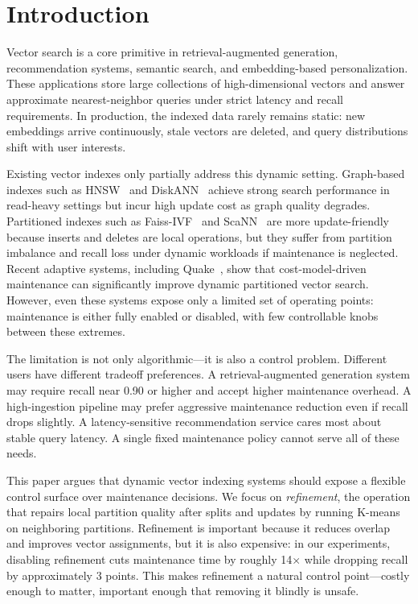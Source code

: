 \documentclass[sigconf, nonacm]{acmart}
\newcommand{\quake}{Quake\xspace}
\begin{document}
\maketitle

\section{Introduction}
\label{sec:intro}

Vector search is a core primitive in retrieval-augmented generation,
recommendation systems, semantic search, and embedding-based
personalization. These applications store large collections of
high-dimensional vectors and answer approximate nearest-neighbor queries
under strict latency and recall requirements. In production, the indexed
data rarely remains static: new embeddings arrive continuously, stale
vectors are deleted, and query distributions shift with user interests.

Existing vector indexes only partially address this dynamic setting.
Graph-based indexes such as HNSW~\cite{malkov2018efficient} and
DiskANN~\cite{jayaram2019diskann} achieve strong search performance in
read-heavy settings but incur high update cost as graph quality
degrades. Partitioned indexes such as Faiss-IVF~\cite{johnson2019billion}
and ScaNN~\cite{guo2020accelerating} are more update-friendly because
inserts and deletes are local operations, but they suffer from partition
imbalance and recall loss under dynamic workloads if maintenance is
neglected. Recent adaptive systems, including \quake~\cite{todo-quake},
show that cost-model-driven maintenance can significantly improve dynamic
partitioned vector search. However, even these systems expose only a
limited set of operating points: maintenance is either fully enabled or
disabled, with few controllable knobs between these extremes.

The limitation is not only algorithmic---it is also a control problem.
Different users have different tradeoff preferences. A
retrieval-augmented generation system may require recall near 0.90 or
higher and accept higher maintenance overhead. A high-ingestion pipeline
may prefer aggressive maintenance reduction even if recall drops
slightly. A latency-sensitive recommendation service cares most about
stable query latency. A single fixed maintenance policy cannot serve all
of these needs.

This paper argues that dynamic vector indexing systems should expose a
flexible control surface over maintenance decisions. We focus on
\emph{refinement}, the operation that repairs local partition quality
after splits and updates by running K-means on neighboring partitions.
Refinement is important because it reduces overlap and improves vector
assignments, but it is also expensive: in our experiments, disabling
refinement cuts maintenance time by roughly 14$\times$ while dropping
recall by approximately 3 points. This makes refinement a natural
control point---costly enough to matter, important enough that removing
it blindly is unsafe.
\end{document}

